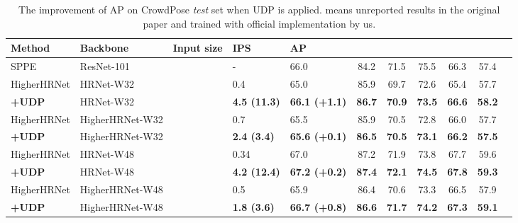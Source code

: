 \documentclass[10pt,journal,compsoc]{IEEEtran}
\begin{document}
\begin{table*}[t]
\caption{The improvement of AP on CrowdPose \textit{test} set when UDP is applied.  means unreported results in the original paper and trained with official implementation by us.}
\label{tab:crowdpose}
\footnotesize
\begin{center}
\begin{tabular}{l|l|c|l|lcccccc}

\hline
Method                            & Backbone      &Input size             &IPS   &AP                     &  &    &    &        & \\
\hline
SPPE \cite{Crowdpose}             & ResNet-101    &         &-     &66.0                   & 84.2             & 71.5               & 75.5              &66.3                   &57.4\\
HigherHRNet \cite{Higher}&HRNet-W32      &         &0.4   &65.0                   & 85.9             & 69.7               & 72.6              &65.4                   &57.7\\
\textbf{+UDP}                     &HRNet-W32      &         &\textbf{4.5 (11.3)}   &\textbf{66.1 (+1.1)}          & \textbf{86.7}    & \textbf{70.9}      & \textbf{73.5}     &\textbf{66.6}          &\textbf{58.2}\\
HigherHRNet \cite{Higher}&HigherHRNet-W32&         &0.7   &65.5                   & 85.9             & 70.5               & 72.8              &66.0                   &57.7\\
\textbf{+UDP}                     &HigherHRNet-W32&         &\textbf{2.4 (3.4)}   &\textbf{65.6 (+0.1)}          & \textbf{86.5}    & \textbf{70.5}      & \textbf{73.1}     &\textbf{66.2}          &\textbf{57.5}\\
HigherHRNet \cite{Higher}&HRNet-W48      &         &0.34   &67.0                   & 87.2             & 71.9               & 73.8              &67.7                   &59.6\\
\textbf{+UDP}                     &HRNet-W48      &         &\textbf{4.2 (12.4)}   &\textbf{67.2 (+0.2)}   & \textbf{87.4}    & \textbf{72.1}      & \textbf{74.5}     &\textbf{67.8}          &\textbf{59.3}\\
HigherHRNet \cite{Higher}         &HigherHRNet-W48&         &0.5   &65.9                   & 86.4             & 70.6               & 73.3              &66.5                   &57.9\\
\textbf{+UDP}                     &HigherHRNet-W48&         &\textbf{1.8 (3.6)}   &\textbf{66.7 (+0.8)}   & \textbf{86.6}    & \textbf{71.7}      & \textbf{74.2}     &\textbf{67.3}          &\textbf{59.1}\\

\end{tabular}
\end{center}
\end{table*}
\end{document}
